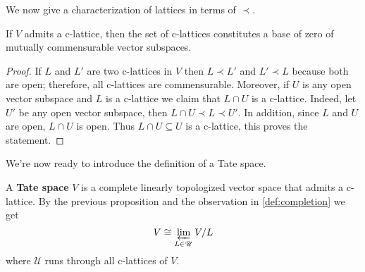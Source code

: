 We now give a characterization of lattices in terms of $\prec$.
\begin{proposition}\label{prop:lattices-are-basis}
	If $V$ admits a c-lattice, then the set of c-lattices constitutes a base of zero of mutually commensurable vector subspaces.
\end{proposition}
\begin{proof}
	If $L$ and $L'$ are two c-lattices in $V$ then $L \prec L'$ and $L' \prec L$ because both are open; therefore, all c-lattices are commensurable. Moreover, if $U$ is any open vector subspace and $L$ is a c-lattice we claim that $L \cap U$ is a c-lattice. Indeed, let $U'$ be any open vector subspace, then $L\cap U \prec L\prec U'$. In addition, since $L$ and $U$ are open, $L \cap U$ is open. Thus $L \cap U \subseteq U$ is a c-lattice, this proves the statement.
\end{proof}
We're now ready to introduce the definition of a Tate space.
\begin{definition}\label{def:tate-vector-space}
	A \textbf{Tate space} $V$ is a complete linearly topologized vector space that admits a c-lattice. By the previous proposition and the observation in \cref{def:completion} we get
	\[
		V \cong \varprojlim_{L \in \mathscr{U}} V/L
	\]
	where $\mathscr{U}$ runs through all c-lattices of $V$.
\end{definition}
